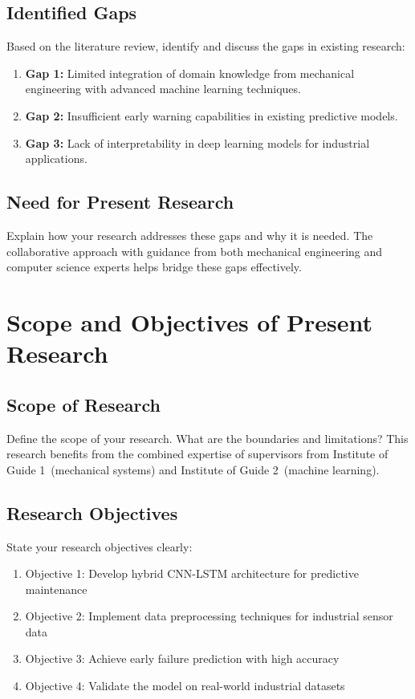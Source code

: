 \documentclass[12pt,a4paper]{report}
\newcommand{\guideIinst}{Institute of Guide 1}
\newcommand{\guideIIinst}{Institute of Guide 2}
\begin{document}
\section{Identified Gaps}
Based on the literature review, identify and discuss the gaps in existing research:

\begin{enumerate}
\item \textbf{Gap 1:} Limited integration of domain knowledge from mechanical engineering with advanced machine learning techniques.
\item \textbf{Gap 2:} Insufficient early warning capabilities in existing predictive models.
\item \textbf{Gap 3:} Lack of interpretability in deep learning models for industrial applications.
\end{enumerate}

\section{Need for Present Research}
Explain how your research addresses these gaps and why it is needed.
The collaborative approach with guidance from both mechanical engineering and computer science experts helps bridge these gaps effectively.

\chapter{Scope and Objectives of Present Research}
\label{ch:objectives}

\section{Scope of Research}
Define the scope of your research.
What are the boundaries and limitations? This research benefits from the combined expertise of supervisors from \guideIinst\ (mechanical systems) and \guideIIinst\ (machine learning).

\section{Research Objectives}
State your research objectives clearly:

\begin{enumerate}
\item Objective 1: Develop hybrid CNN-LSTM architecture for predictive maintenance
\item Objective 2: Implement data preprocessing techniques for industrial sensor data
\item Objective 3: Achieve early failure prediction with high accuracy
\item Objective 4: Validate the model on real-world industrial datasets
\end{enumerate}
\end{document}
